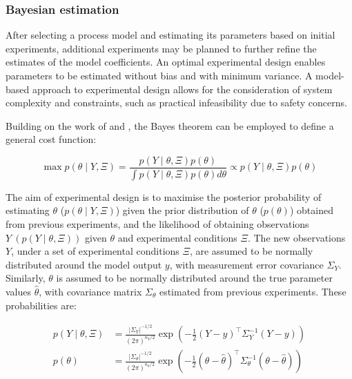 \documentclass[a4paper,fleqn]{cas-dc}
\begin{document}
		\subsubsection{Bayesian estimation}
		
		After selecting a process model and estimating its parameters based on initial experiments, additional experiments may be planned to further refine the estimates of the model coefficients. An optimal experimental design enables parameters to be estimated without bias and with minimum variance. A model-based approach to experimental design allows for the consideration of system complexity and constraints, such as practical infeasibility due to safety concerns.
		
		Building on the work of \citet{Walter2010} and \citet{Himmelblau1970}, the Bayes theorem can be employed to define a general cost function:
		
		{\footnotesize
			\begin{equation}
				\max p\left(\theta \mid Y, \Xi \right) = \frac{p\left(Y \mid \theta, \Xi\right) p\left(\theta\right)}{\int p\left(Y \mid \theta, \Xi\right) p\left(\theta\right) d\theta} \propto p\left(Y \mid \theta, \Xi\right) p\left(\theta\right)
			\end{equation}
		}
		
		The aim of experimental design is to maximise the posterior probability of estimating $\theta$ ($p\left(\theta \mid Y, \Xi \right)$) given the prior distribution of $\theta$ ($p(\theta)$) obtained from previous experiments, and the likelihood of obtaining observations $Y~\left(p\left(Y \mid \theta, \Xi\right)\right)$ given $\theta$ and experimental conditions $\Xi$. The new observations $Y$, under a set of experimental conditions $\Xi$, are assumed to be normally distributed around the model output $y$, with measurement error covariance $\Sigma_Y$. Similarly, $\theta$ is assumed to be normally distributed around the true parameter values $\hat{\theta}$, with covariance matrix $\Sigma_\theta$ estimated from previous experiments. These probabilities are:
		
		{\footnotesize
			\begin{align} 
				p\left(Y \mid \theta, \Xi \right) &= \frac{|\Sigma_Y|^{-1/2}}{\left(2\pi\right)^{n_Y/2}} \exp\left( -\frac{1}{2} \left(Y - y \right)^\top \Sigma_Y^{-1} \left(Y - y\right) \right) \\
				p\left(\theta\right) &= \frac{|\Sigma_\theta|^{-1/2}}{\left(2\pi\right)^{n_\theta/2}} \exp\left( -\frac{1}{2} \left(\theta - \hat{\theta}\right)^\top \Sigma_\theta^{-1} \left(\theta - \hat{\theta}\right) \right)
			\end{align}
		}
		
\end{document}
